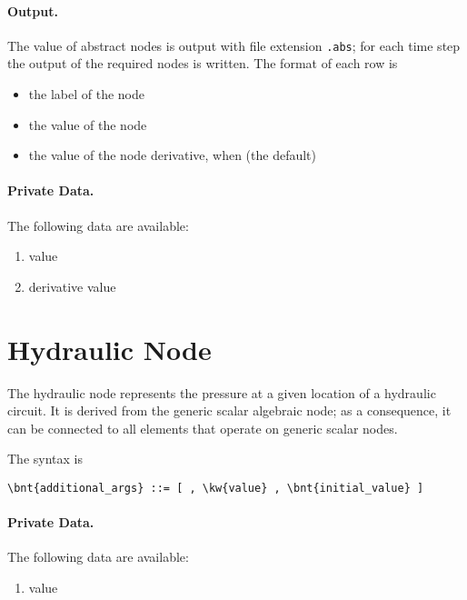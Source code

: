 \paragraph{Output.}
The value of abstract nodes is output with file extension \texttt{.abs}; for
each time step the output of the required nodes is written.
The format of each row is
\begin{itemize}
    \item the label of the node
    \item the value of the node
    \item the value of the node derivative, when  (the default)
\end{itemize}

\paragraph{Private Data.}
\label{sec:NODE:ABSTRACT:PRIV}
The following data are available:
\begin{enumerate}
\item {} value
\item {} derivative value
\end{enumerate}



\section{Hydraulic Node}
\label{sec:NODE:HYDRAULIC}
The hydraulic node represents the pressure
at a given location of a hydraulic circuit.
It is derived from the generic scalar algebraic node; as a consequence,
it can be connected to all elements that operate on generic scalar nodes. 

The syntax is
\begin{Verbatim}[commandchars=\\\{\}]
    \bnt{additional_args} ::= [ , \kw{value} , \bnt{initial_value} ]
\end{Verbatim}

\paragraph{Private Data.}
\label{sec:NODE:HYDRAULIC:PRIV}
The following data are available:
\begin{enumerate}
\item {} value
\end{enumerate}



